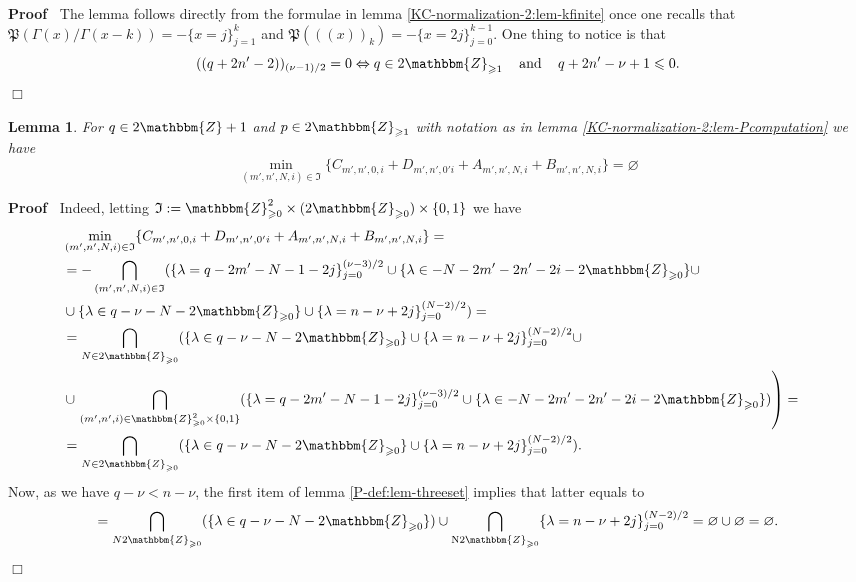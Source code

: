 \documentclass{article}
\newcommand{\Nu}{\mathrm{N}}
\newcommand{\assign}{:=}
\newcommand{\nobracket}{}
\newcommand{\tmop}[1]{\ensuremath{\operatorname{#1}}}
\newenvironment{proof}{\noindent\textbf{Proof\ }}{\hspace*{\fill}$\Box$\medskip}
\numberwithin{definition}{section}
\newtheorem{lemma}{Lemma}
\numberwithin{lemma}{section}
\numberwithin{proposition}{section}
{\theorembodyfont{\rmfamily}\newtheorem{remark}{Remark}
\numberwithin{remark}{section}
}
\begin{document}
\begin{proof}
  The lemma follows directly from the formulae in lemma
  \ref{KC-normalization-2:lem-kfinite} once one recalls that $\mathfrak{P} (
  \Gamma ( x) / \Gamma ( x - k)) = - \{ x = j \}_{j = 1}^k$ and $\mathfrak{P}
  ( ( ( x))_k) = - \{ x = 2 j \}_{j = 0}^{k - 1}$. One thing to notice is that
  \[ ( ( q + 2 n' - 2))_{( \nu - 1) / 2} = 0 \Leftrightarrow q \in
     2\mathbbm{Z}_{\geqslant 1} \hspace{1em} \tmop{and} \hspace{1em} q + 2 n'
     - \nu + 1 \leqslant 0. \]
\end{proof}

\begin{lemma}
  \label{KC-normalization-2:lem-normalization-qodd-aux-1}For $q \in
  2\mathbbm{Z}+ 1$ and $p \in 2\mathbbm{Z}_{\geqslant 1}$ with notation as in
  lemma \ref{KC-normalization-2:lem-Pcomputation} we have
  \[ \min_{( m', n', N, i) \in \mathfrak{I}} \{ C_{m', n', 0, i} + D_{m', n',
     0' i} + A_{m', n', N, i} + B_{m', n', N, i} \} = \varnothing \]
\end{lemma}

\begin{proof}
  Indeed, letting $\mathfrak{I} \assign \mathbbm{Z}_{\geqslant 0}^2 \times (
  2\mathbbm{Z}_{\geqslant 0}) \times \{ 0, 1 \}$ we have
  \begin{eqnarray}
    & \min_{( m', n', N, i) \in \mathfrak{I}} \{ C_{m', n', 0, i} + D_{m',
    n', 0' i} + A_{m', n', N, i} + B_{m', n', N, i} \} = &  \nonumber\\
    & = - \bigcap_{( m', n', N, i) \in \mathfrak{I}} ( \{ \lambda = q - 2 m'
    - N - 1 - 2 j \}_{j = 0}^{( \nu - 3) / 2} \cup \{ \lambda \in - N - 2 m' -
    2 n' - 2 i - 2\mathbbm{Z}_{\geqslant 0} \} \nobracket \cup &  \nonumber\\
    & \cup \{ \lambda \in q - \nu - N - 2\mathbbm{Z}_{\geqslant 0} \}
    \nobracket \cup \{ \lambda = n - \nu + 2 j \}_{j = 0}^{( N - 2) / 2}) = & 
    \nonumber\\
    & = \bigcap_{N \in 2\mathbbm{Z}_{\geqslant 0}} ( \{ \lambda \in q - \nu -
    N - 2\mathbbm{Z}_{\geqslant 0} \} \cup \{ \lambda = n - \nu + 2 j \}_{j =
    0}^{( N - 2) / 2} \cup \nobracket &  \nonumber\\
    & \cup \left. \bigcap_{( m', n', i) \in \mathbbm{Z}_{\geqslant 0}^2
    \times \{ 0, 1 \}} ( \{ \lambda = q - 2 m' - N - 1 - 2 j \}_{j = 0}^{( \nu
    - 3) / 2} \cup \{ \lambda \in - N - 2 m' - 2 n' - 2 i -
    2\mathbbm{Z}_{\geqslant 0} \}) \right) = &  \nonumber\\
    & = \bigcap_{N \in 2\mathbbm{Z}_{\geqslant 0}} ( \{ \lambda \in q - \nu -
    N - 2\mathbbm{Z}_{\geqslant 0} \} \cup \{ \lambda = n - \nu + 2 j \}_{j =
    0}^{( N - 2) / 2}) . &  \nonumber
  \end{eqnarray}
  Now, as we have $q - \nu < n - \nu$, the first item of lemma
  \ref{P-def:lem-threeset} implies that latter equals to
  \[ = \bigcap_{N 2\mathbbm{Z}_{\geqslant 0}} ( \{ \lambda \in q - \nu - N -
     2\mathbbm{Z}_{\geqslant 0} \}) \cup \bigcap_{\Nu 2\mathbbm{Z}_{\geqslant
     0}} \{ \lambda = n - \nu + 2 j \}_{j = 0}^{( N - 2) / 2} = \varnothing
     \cup \varnothing = \varnothing . \]
\end{proof}
\end{document}
